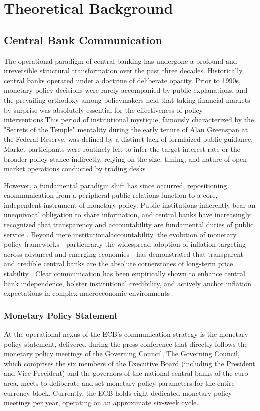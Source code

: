 \chapter{Theoretical Background}

\section{Central Bank Communication}
The operational paradigm of central banking has undergone a profound and irreversible structural transformation over the past three decades.
Historically, central banks operated under a doctrine of deliberate opacity. Prior to 1990s, monetary policy decisions were rarely accompanied
by public explanations, and the prevailing orthodoxy among policymakers held that taking financial markets by surprise was absolutely essential
for the effectiveness of policy interventions.This period of institutional mystique, famously characterized by the "Secrets of the Temple"
mentality during the early tenure of Alan Greenspan at the Federal Reserve, was defined by a distinct lack of formlaized public guidance. Market
participants were routinely left to infer the target interest rate or the broader policy stance indirectly, relying on the size, timing,
and nature of open market operations conducted by trading desks \cite{NBERw11898}.

However, a fundamental paradigm shift has since occurred, repositioning caommunication from a peripheral public relations function to a core,
independent instrument of monetary policy. Public institutions inherently bear an unequivocal obligation to share information, and central
banks have increasingly recognized that transparency and accountability are fundamental duties of public service \cite{blinder2008central}.
Beyond mere institutionalaccountability, the evolution of monetary policy frameworks—particurarly the widespread adoption of inflation
targeting across advanced and emerging economies—has demonstrated that transparent and credible central banks are the absolute cornerstones
of long-term price stability \cite{daly2025dynamic}.
Clear communication has been empirically shown to enhance central bank independence, bolster institutional credibility, and actively anchor
inflation expectations in complex macroeconomic environments \cite{filardo2008transparency}.

\subsection{Monetary Policy Statement}
At the operational nexus of the ECB's communication strategy is the monetary policy statement, delivered during the press conference that directly
follows the monetary policy meetings of the Governing Council, The Governing Council, which comprises the six members of the Executive Board
(including the President and Vice-Precident) and the governors of the national central banks of the euro area, meets to deliberate and set monetary
policy parameters for the entire currency block. Currently, the ECB holds eight dedicated monetary policy meetings per year, operating on
an approximate six-week cycle.

